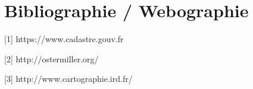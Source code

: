 \chapter{Bibliographie / Webographie}
\begin{description}
\item{[1]} https://www.cadastre.gouv.fr
\item{[2]} http://ostermiller.org/
\item{[3]} http://www.cartographie.ird.fr/
\end{description}
